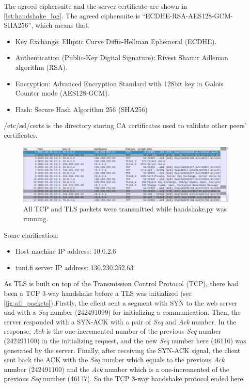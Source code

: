 The agreed ciphersuite and the server certificate are shown in
\autoref{lst:handshake_log}. The agreed ciphersuite is ``ECDHE-RSA-AES128-GCM-SHA256'',
which means that:

\begin{itemize}
    \item Key Exchange: Elliptic Curve Diffie-Hellman Ephemeral (ECDHE).
    \item Authentication (Public-Key Digital Signature): Rivest Shamir Adleman algorithm (RSA).
    \item Encryption: Advanced Encryption Standard with 128bit key in Galois Counter mode
    (AES128-GCM).
    \item Hash: Secure Hash Algorithm 256 (SHA256)
\end{itemize}


{\selectfont /etc/ssl/certs}
is the directory storing CA certificates used to validate other peers' certificates.

\begin{figure}
    \centering
    \includegraphics[height=\textheight,width=\textwidth,keepaspectratio]
    {figures/wireshark_packets.png}
    \caption{All TCP and TLS packets were transmitted while
    {\selectfont handshake.py} was running.}
    \label{fig:all_packets}
\end{figure}



Some clarification:
\begin{itemize}
    \item Host machine IP address: 10.0.2.6
    \item {\selectfont tuni.fi} server IP address: 130.230.252.63
\end{itemize}

As TLS is built on top of the Transmission Control Protocol (TCP), there had been a TCP 3-way
handshake before a TLS was initialized (see \autoref{fig:all_packets}).Firstly, the client
sent a segment with SYN to the web server and with a \emph{Seq} number (242491099)
for initializing a communication. Then, the server responded with a SYN-ACK with a pair of
\emph{Seq} and \emph{Ack} number. In the response, \emph{Ack} is the one-incremented number
of the previous \emph{Seq} number (242491100) in the initializing request, and the new \emph{Seq} number
here (46116) was generated by the server. Finally, after receiving the SYN-ACK signal, the client
sent back the ACK with the \emph{Seq} number which equals to the previous \emph{Ack} number (242491100)
and the \emph{Ack} number which is a one-incremented of the previous \emph{Seq} number (46117).
So the TCP 3-way handshake protocol ended here.

